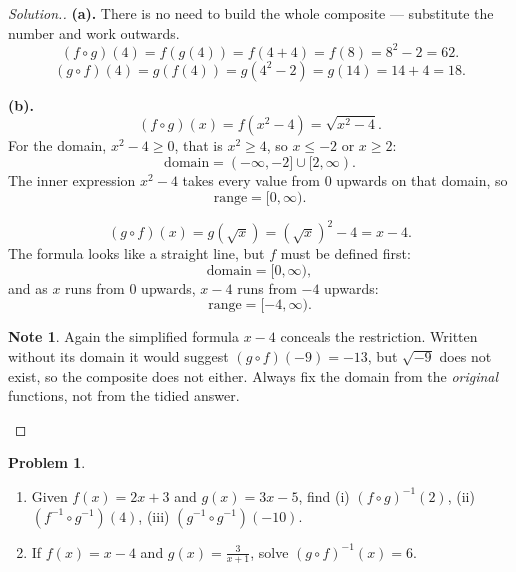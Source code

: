 \documentclass[11pt,a4paper]{article}
\theoremstyle{definition}
\newtheorem{note}[thm]{Note}
\newtheorem{problemx}{Problem}[section]
\newenvironment{problem}{\begin{problemx}}{\end{problemx}}
\newenvironment{solution}
  {\renewcommand{\qedsymbol}{}\begin{proof}[\textit{Solution}.]}
  {\end{proof}}
\begin{document}
\begin{solution}
\textbf{(a).} There is no need to build the whole composite --- substitute the number
and work outwards.
$$(f\circ g)(4)=f\left(g(4)\right)=f(4+4)=f(8)=8^2-2=62.$$
$$(g\circ f)(4)=g\left(f(4)\right)=g\left(4^2-2\right)=g(14)=14+4=18.$$

\textbf{(b).}
$$(f\circ g)(x)=f\left(x^2-4\right)=\sqrt{x^2-4}.$$
For the domain, $x^2-4\geq 0$, that is $x^2\geq 4$, so $x\leq -2$ or $x\geq 2$:
$$\text{domain}=(-\infty,-2]\cup[2,\infty).$$
The inner expression $x^2-4$ takes every value from $0$ upwards on that domain, so
$$\text{range}=[0,\infty).$$

$$(g\circ f)(x)=g\left(\sqrt{x}\right)=\left(\sqrt{x}\right)^2-4=x-4.$$
The formula looks like a straight line, but $f$ must be defined first:
$$\text{domain}=[0,\infty),$$
and as $x$ runs from $0$ upwards, $x-4$ runs from $-4$ upwards:
$$\text{range}=[-4,\infty).$$

\begin{note}
Again the simplified formula $x-4$ conceals the restriction. Written without its domain
it would suggest $(g\circ f)(-9)=-13$, but $\sqrt{-9}$ does not exist, so the composite
does not either. Always fix the domain from the \emph{original} functions, not from the
tidied answer.
\end{note}
\end{solution}

\begin{problem}
\begin{enumerate}
\item[(a).] Given $f(x)=2x+3$ and $g(x)=3x-5$, find
\quad (i) $(f\circ g)^{-1}(2)$, \quad (ii) $\left(f^{-1}\circ g^{-1}\right)(4)$,
\quad (iii) $\left(g^{-1}\circ g^{-1}\right)(-10)$.
\item[(b).] If $f(x)=x-4$ and $g(x)=\frac{3}{x+1}$, solve
$(g\circ f)^{-1}(x)=6$.
\end{enumerate}
\end{problem}
\end{document}

